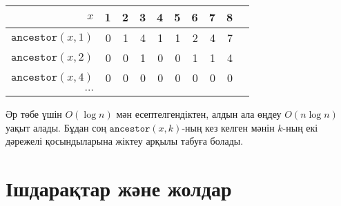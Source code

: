 \begin{center}
\begin{tabular}{r|rrrrrrrrr}
$x$ & 1 & 2 & 3 & 4 & 5 & 6 & 7 & 8 \\
\hline
$\texttt{ancestor}(x,1)$ & 0 & 1 & 4 & 1 & 1 & 2 & 4 & 7 \\
$\texttt{ancestor}(x,2)$ & 0 & 0 & 1 & 0 & 0 & 1 & 1 & 4 \\
$\texttt{ancestor}(x,4)$ & 0 & 0 & 0 & 0 & 0 & 0 & 0 & 0 \\
$\cdots$ \\
\end{tabular}
\end{center}

Әр төбе үшін $O(\log n)$ мән есептелгендіктен, алдын ала өңдеу $O(n \log n)$ уақыт алады.
Бұдан соң $\texttt{ancestor}(x,k)$-ның кез келген мәнін
$k$-ның екі дәрежелі қосындыларына жіктеу арқылы табуға болады.

\section{Ішдарақтар және жолдар}


